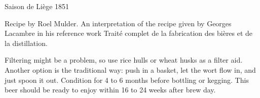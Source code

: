 \begin{recipe}{Saison de Liège 1851}

\begin{aboutblock}
Recipe by Roel Mulder. An interpretation of the recipe given by Georges Lacambre
in his reference work Traité complet de la fabrication des bières et de la
distillation. 
\end{aboutblock}


\begin{methodandtiming}
 
\begin{mashsteps}
\end{mashsteps}

\begin{fermentationsteps}
\end{fermentationsteps}

\begin{directions}
Filtering might be a problem, so use rice hulls or wheat husks as a filter aid. Another
option is the traditional way: push in a basket, let the wort flow in, and just spoon
it out. Condition for 4 to 6 months before bottling or kegging. This beer should be ready
to enjoy within 16 to 24 weeks after brew day.
\end{directions}

\end{methodandtiming}

\recipebreak

\begin{ingredientsblock}

\begin{malts}
\end{malts}

\begin{hops}
\end{hops}


\end{ingredientsblock}

\end{recipe}

